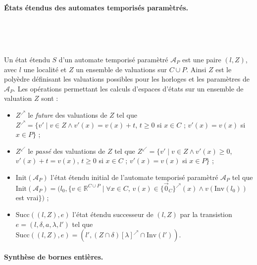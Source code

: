       \paragraph{États étendus des automates temporisés paramètrés.} ~

        ~


        Un état étendu $S$ d'un automate temporisé paramètré $\mathcal{A}_P$ est
        une paire $(l,Z)$, avec $l$ une localité et $Z$ un ensemble de
        valuations sur $C \cup P$. Ainsi $Z$ est le polyèdre définisant les
        valuations possibles pour les horloges et les paramètres de
        $\mathcal{A}_P$. Les opérations permettant les calculs d'espaces d'états
        sur un ensemble de valuation $Z$ sont :

        \begin{itemize}
          \item $Z^\nearrow$ le {\it future} des valuations de $Z$ tel que
            $Z^\nearrow = \{ v' \mid v \in Z \wedge v'(x) = v(x) + t$, $t \geq
            0$ si $x \in C$ ; $v'(x) = v(x)$ si $x \in P \}$ ;
          \item $Z^\swarrow$ le {\it passé} des valuations de $Z$ tel que
            $Z^\swarrow = \{ v' \mid v \in Z \wedge v'(x) \geq 0$, $v'(x) + t =
            v(x)$, $t \geq 0$ si $x \in C$ ; $ v'(x) = v(x)$ si $x \in P \}$ ;
          \item $\mathrm{Init}(\mathcal{A}_P)$ l'état étendu initial de
            l'automate temporisé paramètré $\mathcal{A}_P$ tel que
            $\mathrm{Init}(\mathcal{A}_P) = (l_0, \{ v \in \mathbb{R}^{C \cup P}
            \mid \forall x \in C$, $v(x) \in \{\vec{0}_C\}^\nearrow(x) \wedge
            v(\mathrm{Inv}(l_0))$ est vrai$\})$ ;
          \item $\mathrm{Succ}((l, Z), e)$ l'état étendu successeur de $(l, Z)$
            par la transistion $e = (l, \delta, a, \lambda, l')$ tel que
            $\mathrm{Succ}((l, Z), e) = (l', (Z \cap \delta)[\lambda]^\nearrow
            \cap \mathrm{Inv}(l'))$.
        \end{itemize}


      \paragraph{Synthèse de bornes entières.} ~
      

